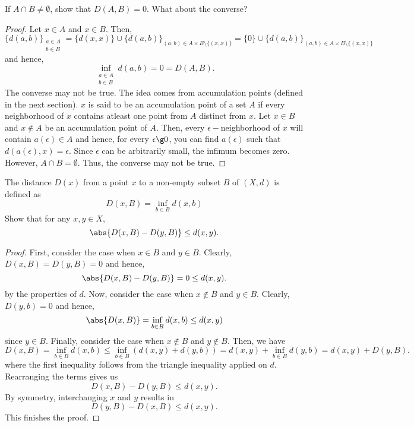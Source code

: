 \begin{question}
    If $A \cap B \neq \emptyset$, show that $D(A,B) = 0$. What about the converse?
    \label{section1.2-9}
\end{question}
\begin{proof}
    Let $x \in A$ and $x \in B$. Then, 
    \[\{d(a,b)\}_{\substack{a\in A \\ b \in B}} = \{d(x,x)\} \cup \{d(a,b)\}_{(a,b) \in A \times B \setminus 
    \{(x,x)\}} = \{0\} \cup \{d(a,b)\}_{(a,b) \in A \times B \setminus 
    \{(x,x)\}} \]
    and hence, 
    \[\inf_{\substack{a \in A \\ b \in B}} d(a,b) = 0 = D(A,B).\]
    The converse may not be true. The idea comes from accumulation points (defined in the next section). $x$ is said to be an accumulation point of a set $A$ if every neighborhood of $x$ contains atleast one point from $A$ distinct from $x$. Let $x \in B$ and $x \notin A$ be an accumulation point of $A$. Then, every $\epsilon-$neighborhood of $x$ will contain $a(\epsilon) \in A$ and hence, for every $\epsilon \g 0$, you can find $a(\epsilon)$ such that $d(a(\epsilon) , x) = \epsilon$. Since $\epsilon$ can be arbitrarily small, the infimum becomes zero. However, $A \cap B = \emptyset$. Thus, the converse may not be true. 
\end{proof}

\begin{question}
    The distance $D(x)$ from a point $x$ to a non-empty subset $B$ of $(X,d)$ is defined as 
    \[D(x,B) = \inf_{b \in B} d(x,b)\]
    Show that for any $x , y \in X$, 
    \[\abs{D(x,B) - D(y,B)} \leq d(x,y).\]
    \label{section1.2-10}
\end{question}
\begin{proof}
    First, consider the case when $x \in B$ and $y \in B$. Clearly, $D(x,B) = D(y,B) = 0$ and hence, 
    \[\abs{D(x,B) - D(y,B)} = 0 \leq d(x,y).\]
    by the properties of $d$.
    Now, consider the case when $x \notin B$ and $y \in B$. Clearly, $D(y,b) = 0$ and hence, 
    \[\abs{D(x,B)} = \inf_{b \in B} d(x,b) \leq d(x,y) \]
    since $y \in B$.
    Finally, consider the case when $x \notin B$ and $y \notin B$. Then, we have
    \[D(x,B) = \inf_{b \in B} d(x,b) \leq \inf_{b \in B}\left( d(x,y) + d(y,b)\right) = d(x,y) + \inf_{b \in B} d(y,b) = d(x,y) + D(y,B).\]
    where the first inequality follows from the triangle inequality applied on $d$. Rearranging the terms gives us
    \[D(x,B) - D(y,B) \leq d(x,y).\]
    By symmetry, interchanging $x$ and $y$ results in 
    \[D(y,B) - D(x,B) \leq d(x,y).\]
    This finishes the proof.
\end{proof}

